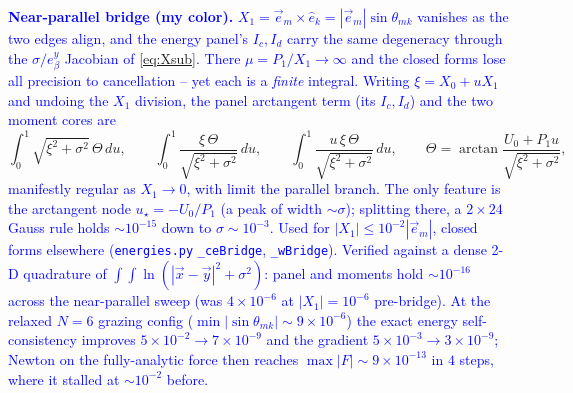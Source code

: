 \documentclass[11pt]{article}
\numberwithin{equation}{section}
\newcommand{\vv}[1]{\vec{#1}}
\newcommand{\cam}[1]{\textcolor{blue}{#1}}
\begin{document}
\cam{\textbf{Near-parallel bridge (my color).} $X_1=\vv e_m\times\hat e_k=|\vv e_m|\sin\theta_{mk}$
vanishes as the two edges align, and the energy panel's $I_c,I_d$ carry the same degeneracy through the
$\sigma/e_\beta^y$ Jacobian of \eqref{eq:Xsub}. There $\mu=P_1/X_1\to\infty$ and the closed forms lose
all precision to cancellation -- yet each is a \emph{finite} integral. Writing $\xi=X_0+uX_1$ and undoing
the $X_1$ division, the panel arctangent term (its $I_c,I_d$) and the two moment cores are}
\[
  \int_0^1\!\sqrt{\xi^2+\sigma^2}\,\Theta\,du,\qquad
  \int_0^1\!\frac{\xi\,\Theta}{\sqrt{\xi^2+\sigma^2}}\,du,\qquad
  \int_0^1\!\frac{u\,\xi\,\Theta}{\sqrt{\xi^2+\sigma^2}}\,du,\qquad
  \Theta=\arctan\frac{U_0+P_1u}{\sqrt{\xi^2+\sigma^2}},
\]
\cam{manifestly regular as $X_1\to0$, with limit the parallel branch. The only feature is the arctangent
node $u_\star=-U_0/P_1$ (a peak of width $\sim\sigma$); splitting there, a $2\times24$ Gauss rule holds
$\sim10^{-15}$ down to $\sigma\sim10^{-3}$. Used for $|X_1|\le10^{-2}|\vv e_m|$, closed forms elsewhere
(\texttt{energies.py} \texttt{\_ceBridge}, \texttt{\_wBridge}).}
\cam{Verified against a dense 2-D quadrature of $\int\!\!\int\ln(|\vv x-\vv y|^2+\sigma^2)$: panel and
moments hold $\sim10^{-16}$ across the near-parallel sweep (was $4\times10^{-6}$ at $|X_1|=10^{-6}$
pre-bridge). At the relaxed $N{=}6$ grazing config ($\min|\sin\theta_{mk}|\!\sim\!9\times10^{-6}$)
the exact energy self-consistency improves $5\times10^{-2}\!\to\!7\times10^{-9}$ and the gradient
$5\times10^{-3}\!\to\!3\times10^{-9}$; Newton on the fully-analytic force then reaches
$\max|F|\!\sim\!9\times10^{-13}$ in $4$ steps, where it stalled at $\sim10^{-2}$ before.}
\end{document}

